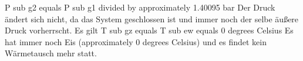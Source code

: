 P sub g2 equals P sub g1 divided by approximately 1.40095 bar
Der Druck ändert sich nicht, da das System geschlossen ist und immer noch der selbe äußere Druck vorherrscht.
Es gilt T sub gz equals T sub ew equals 0 degrees Celsius
Es hat immer noch Eis (approximately 0 degrees Celsius) und es findet kein Wärmetausch mehr statt.
